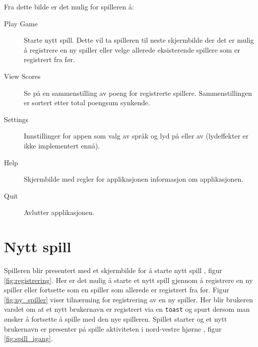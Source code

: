Fra dette bilde er det mulig for spilleren å: 
\begin{description}
\item[Play Game] Starte nytt spill. Dette vil ta spilleren til neste skjermbilde der det er mulig å registrere en ny spiller eller velge allerede eksisterende spillere som er registrert fra før.
\item[View Scores] Se på en sammenstilling av poeng for registrerte spillere. Sammenstillingen er sortert etter total poengsum synkende.
\item[Settings] Innstillinger for appen som valg av språk og lyd på eller av (lydeffekter er ikke implementert ennå).
\item[Help] Skjermbilde med regler for applikasjonen informasjon om applikasjonen. 
\item[Quit] Avlutter applikasjonen. 
\end{description}


\section{Nytt spill}

Spilleren blir presentert med et skjermbilde for å starte nytt spill , figur \ref{fig:registrering}. Her er det mulig å starte et nytt spill gjennom å registrere en ny spiller eller fortsette som en spiller som allerede er registrert fra før. Figur \ref{fig:ny_spiller} viser tilnærming for registrering av en ny spiller. Her blir brukeren varslet om at et nytt brukernavn er registrert via en \texttt{toast} og spurt dersom man ønsker å fortsette å spille med den nye spilleren. Spillet starter og et nytt brukernavn er presenter på spille aktiviteten i nord-vestre hjørne , figur \ref{fig:spill_igang}.

